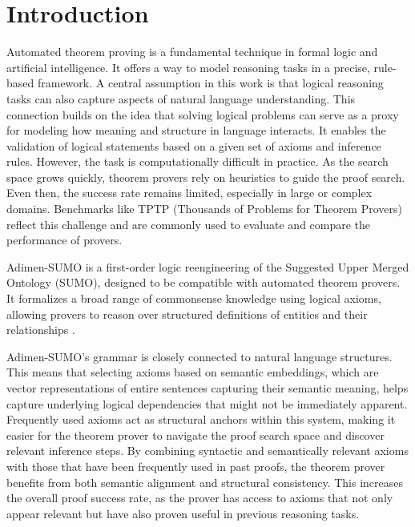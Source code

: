 \documentclass[english,version-2020-11]{uzl-thesis}
\begin{document}
%
%

\chapter{Introduction}
\label{chapter-introduction}

Automated theorem proving is a fundamental technique in formal logic and artificial intelligence. It offers a way to model reasoning tasks in a precise, rule-based framework. A central assumption in this work is that logical reasoning tasks can also capture aspects of natural language understanding. This connection builds on the idea that solving logical problems can serve as a proxy for modeling how meaning and structure in language interacts. It enables the validation of logical statements based on a given set of axioms and inference rules. However, the task is computationally difficult in practice. As the search space grows quickly, theorem provers rely on heuristics to guide the proof search. Even then, the success rate remains limited, especially in large or complex domains. Benchmarks like TPTP (Thousands of Problems for Theorem Provers) reflect this challenge and are commonly used to evaluate and compare the performance of provers.

Adimen-SUMO is a first-order logic reengineering of the Suggested Upper Merged Ontology (SUMO), designed to be compatible with automated theorem provers. It formalizes a broad range of commonsense knowledge using logical axioms, allowing provers to reason over structured definitions of entities and their relationships \cite{Alvez2014}.

Adimen-SUMO’s grammar is closely connected to natural language structures. This means that selecting axioms based on semantic embeddings, which are vector representations of entire sentences capturing their semantic meaning, helps capture underlying logical dependencies that might not be immediately apparent. Frequently used axioms act as structural anchors within this system, making it easier for the theorem prover to navigate the proof search space and discover relevant inference steps. By combining syntactic and semantically relevant axioms with those that have been frequently used in past proofs, the theorem prover benefits from both semantic alignment and structural consistency. This increases the overall proof success rate, as the prover has access to axioms that not only appear relevant but have also proven useful in previous reasoning tasks.
\end{document}
